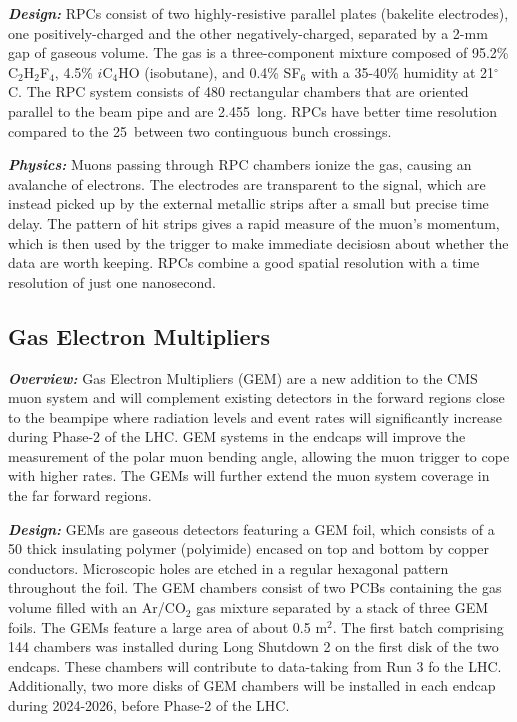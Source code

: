 \textbf{\textit{Design:}}
RPCs consist of two highly-resistive parallel plates (bakelite electrodes), one positively-charged and the other negatively-charged, separated by a 2-mm gap of gaseous volume. The gas is a three-component mixture composed of 95.2\% C$_2$H$_2$F$_4$, 4.5\% $i$C$_4$HO (isobutane), and 0.4\% SF$_6$ with a 35-40\% humidity at 21$^\circ$C. The RPC system consists of 480 rectangular chambers that are oriented parallel to the beam pipe and are 2.455~\mm long. RPCs have better time resolution compared to the 25~\ns between two continguous \pp bunch crossings. 



\textbf{\textit{Physics:}}
Muons passing through RPC chambers ionize the gas, causing an avalanche of electrons. The electrodes are transparent to the signal, which are instead picked up by the external metallic strips after a small but precise time delay. The pattern of hit strips gives a rapid measure of the muon's momentum, which is then used by the trigger to make immediate decisiosn about whether the data are worth keeping. RPCs combine a good spatial resolution with a time resolution of just one nanosecond. 

\subsection{Gas Electron Multipliers}
\label{sec:gem}

\textbf{\textit{Overview:}}
Gas Electron Multipliers (GEM) are a new addition to the CMS muon system and will complement existing detectors in the forward regions close to the beampipe where radiation levels and event rates will significantly increase during Phase-2 of the LHC. GEM systems in the endcaps will improve the measurement of the polar muon bending angle, allowing the muon trigger to cope with higher rates. The GEMs will further extend the muon system coverage in the far forward regions. 

\textbf{\textit{Design:}}
GEMs are gaseous detectors featuring a GEM foil, which consists of a 50 \micron thick insulating polymer (polyimide) encased on top and bottom by copper conductors. Microscopic holes are etched in a regular hexagonal pattern throughout the foil. The GEM chambers consist of two PCBs containing the gas volume filled with an Ar/CO$_2$ gas mixture separated by a stack of three GEM foils. The GEMs feature a large area of about 0.5 m$^2$. The first batch comprising 144 chambers was installed during Long Shutdown 2 on the first disk of the two endcaps. These chambers will contribute to data-taking from Run 3 fo the LHC. Additionally, two more disks of GEM chambers will be installed in each endcap during 2024-2026, before Phase-2 of the LHC. 

